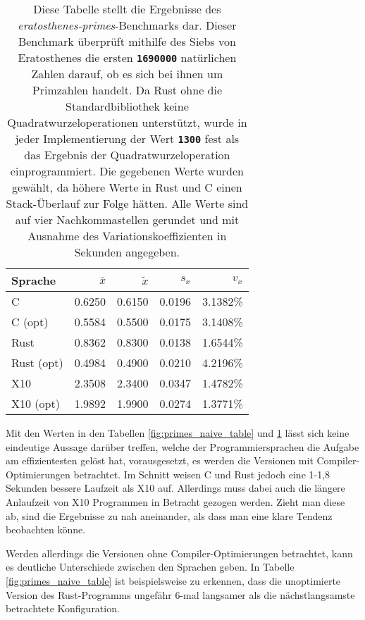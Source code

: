 \begin{table}[hb]
	\begin{center}
		\begin{tabular}{lrrrr}
			\toprule
			Sprache    & $\bar{x}$ & $\tilde{x}$ & $s_x$ & $v_x$ \\
			\midrule
			C          & 0.6250 & 0.6150 & 0.0196 & 3.1382\% \\
			C (opt)    & 0.5584 & 0.5500 & 0.0175 & 3.1408\% \\
			Rust       & 0.8362 & 0.8300 & 0.0138 & 1.6544\% \\
			Rust (opt) & 0.4984 & 0.4900 & 0.0210 & 4.2196\% \\
			X10        & 2.3508 & 2.3400 & 0.0347 & 1.4782\% \\
			X10 (opt)  & 1.9892 & 1.9900 & 0.0274 & 1.3771\% \\
			\bottomrule
		\end{tabular}
	\end{center}
	\caption{
		Diese Tabelle stellt die Ergebnisse des \textit{eratosthenes-primes}-Benchmarks dar.
		Dieser Benchmark überprüft mithilfe des Siebs von Eratosthenes die ersten \texttt{\textsc{\textbf{1690000}}}
		natürlichen Zahlen darauf, ob es sich bei ihnen um Primzahlen handelt.
		Da Rust ohne die Standardbibliothek keine Quadratwurzeloperationen
		unterstützt, wurde in jeder Implementierung der Wert \texttt{\textsc{\textbf{1300}}} fest als das Ergebnis
		der Quadratwurzeloperation einprogrammiert.
		Die gegebenen Werte wurden gewählt, da höhere Werte in Rust und C einen Stack-Überlauf zur Folge hätten.
		Alle Werte sind auf vier Nachkommastellen gerundet und mit Ausnahme des Variationskoeffizienten
		in Sekunden angegeben.
	}
	\label{fig:primes_eratosthenes_table}
\end{table}

Mit den Werten in den Tabellen \ref{fig:primes_naive_table} und \ref{fig:primes_eratosthenes_table} lässt sich keine
eindeutige Aussage darüber treffen, welche der Programmiersprachen die Aufgabe am effizientesten
gelöst hat, vorausgesetzt, es werden die Versionen mit Compiler-Optimierungen betrachtet. Im Schnitt weisen C und Rust
jedoch eine 1-1,8 Sekunden bessere Laufzeit als X10 auf.
Allerdings muss dabei auch die längere Anlaufzeit von X10 Programmen in Betracht gezogen werden.
Zieht man diese ab, sind die Ergebnisse zu nah aneinander, als dass man eine klare Tendenz beobachten könne.

Werden allerdings die Versionen ohne Compiler-Optimierungen betrachtet, kann es deutliche Unterschiede zwischen den
Sprachen geben. In Tabelle \ref{fig:primes_naive_table} ist beispielsweise zu erkennen, dass die unoptimierte
Version des Rust-Programms ungefähr 6-mal langsamer als die nächstlangsamste betrachtete Konfiguration.

